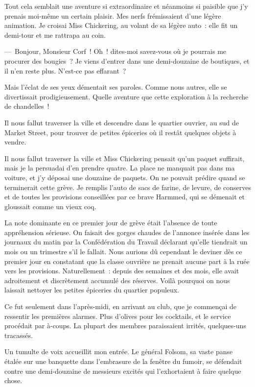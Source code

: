\documentclass[french,twoside]{book} %
\begin{document}
Tout cela semblait une aventure si extraordinaire et néanmoins si paisible que j’y prenais moi-même un certain plaisir. Mes nerfs frémissaient d’une légère animation. Je croisai Miss Chickering, au volant de sa légère auto : elle fit un demi-tour et me rattrapa au coin.\par
— Bonjour, Monsieur Corf ! Oh ! dites-moi savez-vous où je pourrais me procurer des bougies ? Je viens d’entrer dans une demi-douzaine de boutiques, et il n’en reste plus. N’est-ce pas effarant ?\par
Mais l’éclat de ses yeux démentait ses paroles. Comme nous autres, elle se divertissait prodigieusement. Quelle aventure que cette exploration à la recherche de chandelles !\par
Il nous fallut traverser la ville et descendre dans le quartier ouvrier, au sud de Market Street, pour trouver de petites épiceries où il restât quelques objets à vendre.\par
Il nous fallut traverser la ville et Miss Chickering pensait qu’un paquet suffirait, mais je la persuadai d’en prendre quatre. La place ne manquait pas dans ma voiture, et j’y déposai une douzaine de paquets. On ne pouvait prédire quand se terminerait cette grève. Je remplis l’auto de sacs de farine, de levure, de conserves et de toutes les provisions conseillées par ce brave Harmmed, qui se démenait et gloussait comme un vieux coq.\par
La note dominante en ce premier jour de grève était l’absence de toute appréhension sérieuse. On faisait des gorges chaudes de l’annonce insérée dans les journaux du matin par la Confédération du Travail déclarant qu’elle tiendrait un mois ou un trimestre s’il le fallait. Nous aurions dû cependant le deviner dès ce premier jour en constatant que la classe ouvrière ne prenait aucune part à la ruée vers les provisions. Naturellement : depuis des semaines et des mois, elle avait adroitement et discrètement accumulé des réserves. Voilà pourquoi on nous laissait nettoyer les petites épiceries du quartier populeux.\par
Ce fut seulement dans l’après-midi, en arrivant au club, que je commençai de ressentir les premières alarmes. Plus d’olives pour les cocktails, et le service procédait par à-coups. La plupart des membres paraissaient irrités, quelques-uns tracassés.\par
Un tumulte de voix accueillit mon entrée. Le général Folsom, sa vaste panse étalée sur une banquette dans l’embrasure de la fenêtre du fumoir, se défendait contre une demi-douzaine de messieurs excités qui l’exhortaient à faire quelque chose.\par
\end{document}
